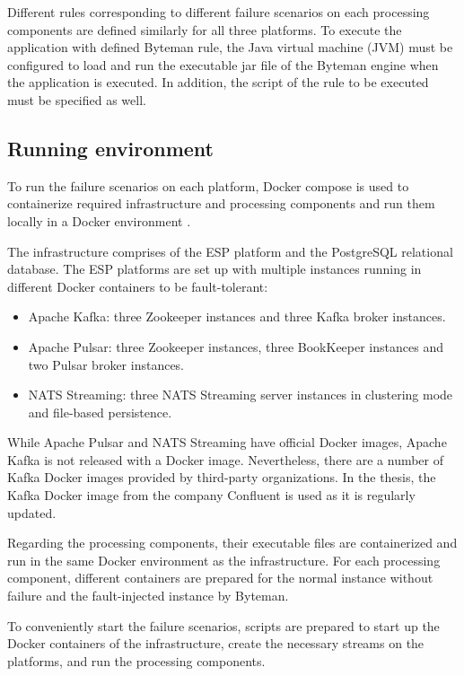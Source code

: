 Different rules corresponding to different failure scenarios on each processing components are defined similarly for all three platforms. To execute the application with defined Byteman rule, the Java virtual machine (JVM) must be configured to load and run the executable jar file of the Byteman engine when the application is executed. In addition, the script of the rule to be executed must be specified as well.

 

\subsection{Running environment}
To run the failure scenarios on each platform, Docker compose is used to containerize required infrastructure and processing components and run them locally in a Docker environment \cite{docker}.

The infrastructure comprises of the ESP platform and the PostgreSQL relational database. The ESP platforms are set up with multiple instances running in different Docker containers to be fault-tolerant:
\begin{itemize}
	\item Apache Kafka: three Zookeeper instances and three Kafka broker instances.
	\item Apache Pulsar: three Zookeeper instances, three BookKeeper instances and two Pulsar broker instances.
	\item NATS Streaming: three NATS Streaming server instances in clustering mode and file-based persistence.
\end{itemize}

While Apache Pulsar and NATS Streaming have official Docker images, Apache Kafka is not released with a Docker image. Nevertheless, there are a number of Kafka Docker images provided by third-party organizations. In the thesis, the Kafka Docker image from the company Confluent is used as it is regularly updated.

Regarding the processing components, their executable files are containerized and run in the same Docker environment as the infrastructure. For each processing component, different containers are prepared for the normal instance without failure and the fault-injected instance by Byteman. 

To conveniently start the failure scenarios, scripts are prepared to start up the Docker containers of the infrastructure, create the necessary streams on the platforms, and run the processing components.
 